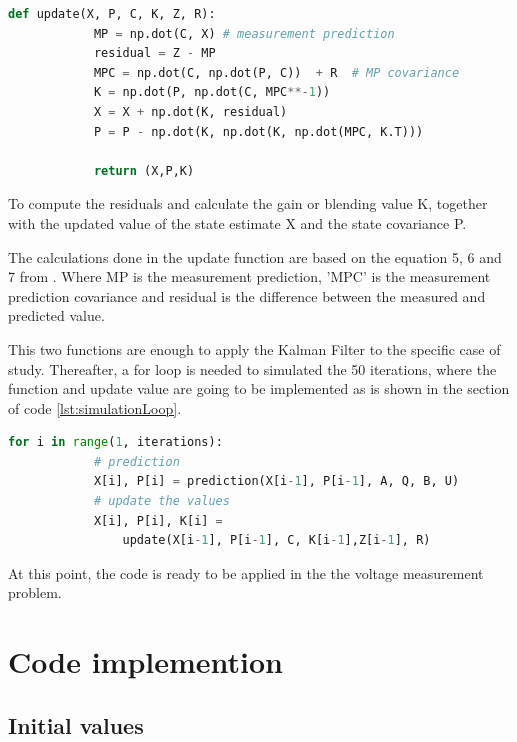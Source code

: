 \documentclass{article}
\begin{document}
    \begin{lstlisting}[language=Python, caption= Update Kalman function, label={lst:update}]
        def update(X, P, C, K, Z, R):
            MP = np.dot(C, X) # measurement prediction
            residual = Z - MP 
            MPC = np.dot(C, np.dot(P, C))  + R  # MP covariance
            K = np.dot(P, np.dot(C, MPC**-1)) 
            X = X + np.dot(K, residual) 
            P = P - np.dot(K, np.dot(K, np.dot(MPC, K.T))) 
    
            return (X,P,K) 
    \end{lstlisting}

    To compute the residuals and calculate the gain or blending value K, together with the updated value of the state estimate X and the
    state covariance P. 

    The calculations done in the update function are based on the equation 5, 6 and 7 from \cite{LabManual}. Where MP is the measurement prediction, 'MPC' is the measurement
    prediction covariance and residual is the difference between the measured and predicted value.

    This two functions are enough to apply the Kalman Filter to the specific case of study. Thereafter, a for loop is needed to simulated the
    50 iterations, where the function and update value are going to be implemented as is shown in the section of code \ref{lst:simulationLoop}.

    \begin{lstlisting}[language=Python, caption= Simulation for n amount if iterations, label={lst:simulationLoop}]
        for i in range(1, iterations):    
            # prediction
            X[i], P[i] = prediction(X[i-1], P[i-1], A, Q, B, U)
            # update the values
            X[i], P[i], K[i] = 
                update(X[i-1], P[i-1], C, K[i-1],Z[i-1], R)
    \end{lstlisting}

    At this point, the code is ready to be applied in the the voltage measurement problem.

    \section{Code implemention}

    \subsection{Initial values}
        
\end{document}
